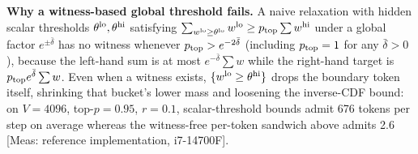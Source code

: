 \documentclass[10pt]{article}
\begin{document}
\textbf{Why a witness-based global threshold fails.} A naive relaxation with hidden scalar thresholds $\theta^{\rm lo},\theta^{\rm hi}$ satisfying $\sum_{w^{\rm lo}\ge\theta^{\rm lo}}w^{\rm lo}\ge p_{\rm top}\sum w^{\rm hi}$ under a global factor $e^{\pm\bar\delta}$ has no witness whenever $p_{\rm top}>e^{-2\bar\delta}$ (including $p_{\rm top}=1$ for any $\bar\delta>0$), because the left-hand sum is at most $e^{-\bar\delta}\sum w$ while the right-hand target is $p_{\rm top}e^{\bar\delta}\sum w$. Even when a witness exists, $\{w^{\rm lo}\ge\theta^{\rm hi}\}$ drops the boundary token itself, shrinking that bucket's lower mass and loosening the inverse-CDF bound: on $V=4096$, top-$p=0.95$, $r=0.1$, scalar-threshold bounds admit 676 tokens per step on average whereas the witness-free per-token sandwich above admits 2.6 [Meas: reference implementation, i7-14700F].
\end{document}
